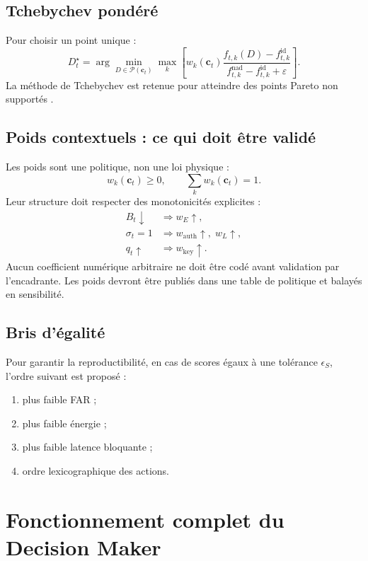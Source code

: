 \documentclass[conference,a4paper]{IEEEtran}
\begin{document}
\subsection{Tchebychev pondéré}
Pour choisir un point unique :
\begin{equation}
D_t^\star=\arg\min_{D\in\mathcal{P}(\mathbf{c}_t)}
\max_k\left[
w_k(\mathbf{c}_t)
\frac{f_{t,k}(D)-f_{t,k}^{\mathrm{id}}}
{f_{t,k}^{\mathrm{nad}}-f_{t,k}^{\mathrm{id}}+\varepsilon}
\right].
\label{eq:tcheby}
\end{equation}
La méthode de Tchebychev est retenue pour atteindre des points Pareto non supportés \cite{wierzbicki1982,miettinen1999}.

\subsection{Poids contextuels : ce qui doit être validé}
Les poids sont une politique, non une loi physique :
\begin{equation}
w_k(\mathbf{c}_t)\geq0,\qquad \sum_kw_k(\mathbf{c}_t)=1.
\end{equation}
Leur structure doit respecter des monotonicités explicites :
\begin{align}
B_t\downarrow &\Rightarrow w_E\uparrow,\\
\sigma_t=1 &\Rightarrow w_{\mathrm{auth}}\uparrow,\;w_L\uparrow,\\
q_t\uparrow &\Rightarrow w_{\mathrm{key}}\uparrow.
\end{align}
Aucun coefficient numérique arbitraire ne doit être codé avant validation par l'encadrante. Les poids devront être publiés dans une table de politique et balayés en sensibilité.

\subsection{Bris d'égalité}
Pour garantir la reproductibilité, en cas de scores égaux à une tolérance $\epsilon_S$, l'ordre suivant est proposé :
\begin{enumerate}
    \item plus faible FAR ;
    \item plus faible énergie ;
    \item plus faible latence bloquante ;
    \item ordre lexicographique des actions.
\end{enumerate}

\section{Fonctionnement complet du Decision Maker}
\end{document}
